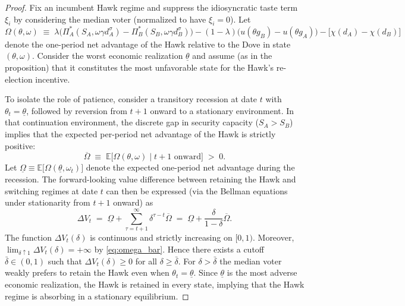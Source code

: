 \begin{proof}
Fix an incumbent Hawk regime and suppress the idiosyncratic taste term $\xi_i$ by considering the median voter (normalized to have $\xi_i=0$). Let
\begin{equation}
\Omega(\theta,\omega)\;\equiv\;\lambda\Big(\Pi_A^*(S_A,\omega\gamma d_A^{\sigma})-\Pi_B^*(S_B,\omega\gamma d_B^{\sigma})\Big)-(1-\lambda)\Big(u(\theta g_B)-u(\theta g_A)\Big)-\big[\chi(d_A)-\chi(d_B)\big]
\end{equation}
denote the one-period net advantage of the Hawk relative to the Dove in state $(\theta,\omega)$. Consider the worst economic realization $\underline{\theta}$ and assume (as in the proposition) that it constitutes the most unfavorable state for the Hawk's re-election incentive.

To isolate the role of patience, consider a transitory recession at date $t$ with $\theta_t=\underline{\theta}$, followed by reversion from $t+1$ onward to a stationary environment. In that continuation environment, the discrete gap in security capacity ($S_A>S_B$) implies that the expected per-period net advantage of the Hawk is strictly positive:
\begin{equation} \label{eq:omega_bar}
\overline{\Omega}\;\equiv\;\mathbb{E}\big[\Omega(\theta,\omega)\mid t+1\text{ onward}\big]\;>\;0.
\end{equation}
Let $\underline{\Omega}\equiv \mathbb{E}\big[\Omega(\underline{\theta},\omega_t)\big]$ denote the expected one-period net advantage during the recession. The forward-looking value difference between retaining the Hawk and switching regimes at date $t$ can then be expressed (via the Bellman equations under stationarity from $t+1$ onward) as
\begin{equation}
\Delta V_t \;=\; \underline{\Omega} + \sum_{\tau=t+1}^{\infty}\delta^{\tau-t}\overline{\Omega}
\;=\; \underline{\Omega} + \frac{\delta}{1-\delta}\overline{\Omega}.
\end{equation}
The function $\Delta V_t(\delta)$ is continuous and strictly increasing on $[0,1)$. Moreover, $\lim_{\delta\uparrow 1}\Delta V_t(\delta)=+\infty$ by \autoref{eq:omega_bar}. Hence there exists a cutoff $\bar{\delta}\in(0,1)$ such that $\Delta V_t(\delta)\ge 0$ for all $\delta\ge \bar{\delta}$. For $\delta>\bar{\delta}$ the median voter weakly prefers to retain the Hawk even when $\theta_t=\underline{\theta}$. Since $\underline{\theta}$ is the most adverse economic realization, the Hawk is retained in every state, implying that the Hawk regime is absorbing in a stationary equilibrium.
\end{proof}

